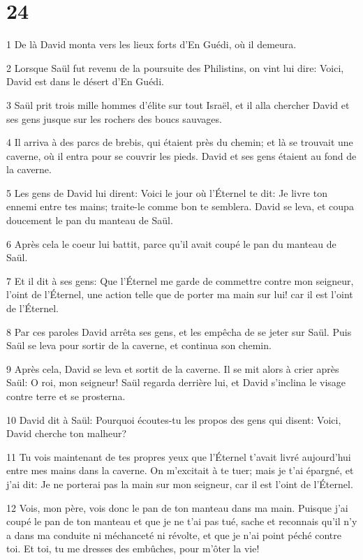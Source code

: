\chapter{24}

\par 1 De là David monta vers les lieux forts d'En Guédi, où il demeura.
\par 2 Lorsque Saül fut revenu de la poursuite des Philistins, on vint lui dire: Voici, David est dans le désert d'En Guédi.
\par 3 Saül prit trois mille hommes d'élite sur tout Israël, et il alla chercher David et ses gens jusque sur les rochers des boucs sauvages.
\par 4 Il arriva à des parcs de brebis, qui étaient près du chemin; et là se trouvait une caverne, où il entra pour se couvrir les pieds. David et ses gens étaient au fond de la caverne.
\par 5 Les gens de David lui dirent: Voici le jour où l'Éternel te dit: Je livre ton ennemi entre tes mains; traite-le comme bon te semblera. David se leva, et coupa doucement le pan du manteau de Saül.
\par 6 Après cela le coeur lui battit, parce qu'il avait coupé le pan du manteau de Saül.
\par 7 Et il dit à ses gens: Que l'Éternel me garde de commettre contre mon seigneur, l'oint de l'Éternel, une action telle que de porter ma main sur lui! car il est l'oint de l'Éternel.
\par 8 Par ces paroles David arrêta ses gens, et les empêcha de se jeter sur Saül. Puis Saül se leva pour sortir de la caverne, et continua son chemin.
\par 9 Après cela, David se leva et sortit de la caverne. Il se mit alors à crier après Saül: O roi, mon seigneur! Saül regarda derrière lui, et David s'inclina le visage contre terre et se prosterna.
\par 10 David dit à Saül: Pourquoi écoutes-tu les propos des gens qui disent: Voici, David cherche ton malheur?
\par 11 Tu vois maintenant de tes propres yeux que l'Éternel t'avait livré aujourd'hui entre mes mains dans la caverne. On m'excitait à te tuer; mais je t'ai épargné, et j'ai dit: Je ne porterai pas la main sur mon seigneur, car il est l'oint de l'Éternel.
\par 12 Vois, mon père, vois donc le pan de ton manteau dans ma main. Puisque j'ai coupé le pan de ton manteau et que je ne t'ai pas tué, sache et reconnais qu'il n'y a dans ma conduite ni méchanceté ni révolte, et que je n'ai point péché contre toi. Et toi, tu me dresses des embûches, pour m'ôter la vie!
